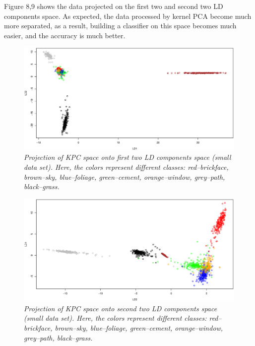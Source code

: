 \documentclass{article}
\begin{document}
Figure 8,9 shows the data projected on the first two and second two LD components space. As expected, the data processed by kernel PCA become much
more separated, as a result, building a classifier on this space becomes much easier, and the accuracy is much better.

\begin{figure}[htp]
\centering
\includegraphics[width=12.1cm]{small_kpcalda_LD12_train.eps}
\caption{\textit{Projection of KPC space onto first two LD components space (small data set). Here, the colors represent different classes: red--brickface, brown--sky, 
blue--foliage, green--cement, orange--window, grey--path, black--grass.}}
\end{figure}

\begin{figure}[htp]
\centering
\includegraphics[width=12.1cm]{small_kpcalda_LD34_train.eps}
\caption{\textit{Projection of KPC space onto second two LD components space (small data set). Here, the colors represent different classes: red--brickface, brown--sky, 
blue--foliage, green--cement, orange--window, grey--path, black--grass.}}
\end{figure}
\end{document}
